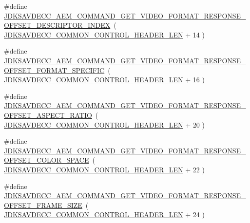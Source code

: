 \begin{DoxyCompactItemize}
\item 
\#define \hyperlink{group__command__get__video__format__response_gad665bc5c28acc6a13b96ad08b5cb703d}{J\+D\+K\+S\+A\+V\+D\+E\+C\+C\+\_\+\+A\+E\+M\+\_\+\+C\+O\+M\+M\+A\+N\+D\+\_\+\+G\+E\+T\+\_\+\+V\+I\+D\+E\+O\+\_\+\+F\+O\+R\+M\+A\+T\+\_\+\+R\+E\+S\+P\+O\+N\+S\+E\+\_\+\+O\+F\+F\+S\+E\+T\+\_\+\+D\+E\+S\+C\+R\+I\+P\+T\+O\+R\+\_\+\+I\+N\+D\+EX}~( \hyperlink{group__jdksavdecc__avtp__common__control__header_gaae84052886fb1bb42f3bc5f85b741dff}{J\+D\+K\+S\+A\+V\+D\+E\+C\+C\+\_\+\+C\+O\+M\+M\+O\+N\+\_\+\+C\+O\+N\+T\+R\+O\+L\+\_\+\+H\+E\+A\+D\+E\+R\+\_\+\+L\+EN} + 14 )
\item 
\#define \hyperlink{group__command__get__video__format__response_ga496580d22b9f558564fd5c42bab2b99d}{J\+D\+K\+S\+A\+V\+D\+E\+C\+C\+\_\+\+A\+E\+M\+\_\+\+C\+O\+M\+M\+A\+N\+D\+\_\+\+G\+E\+T\+\_\+\+V\+I\+D\+E\+O\+\_\+\+F\+O\+R\+M\+A\+T\+\_\+\+R\+E\+S\+P\+O\+N\+S\+E\+\_\+\+O\+F\+F\+S\+E\+T\+\_\+\+F\+O\+R\+M\+A\+T\+\_\+\+S\+P\+E\+C\+I\+F\+IC}~( \hyperlink{group__jdksavdecc__avtp__common__control__header_gaae84052886fb1bb42f3bc5f85b741dff}{J\+D\+K\+S\+A\+V\+D\+E\+C\+C\+\_\+\+C\+O\+M\+M\+O\+N\+\_\+\+C\+O\+N\+T\+R\+O\+L\+\_\+\+H\+E\+A\+D\+E\+R\+\_\+\+L\+EN} + 16 )
\item 
\#define \hyperlink{group__command__get__video__format__response_ga0a5642f617922b5a28527768730f1831}{J\+D\+K\+S\+A\+V\+D\+E\+C\+C\+\_\+\+A\+E\+M\+\_\+\+C\+O\+M\+M\+A\+N\+D\+\_\+\+G\+E\+T\+\_\+\+V\+I\+D\+E\+O\+\_\+\+F\+O\+R\+M\+A\+T\+\_\+\+R\+E\+S\+P\+O\+N\+S\+E\+\_\+\+O\+F\+F\+S\+E\+T\+\_\+\+A\+S\+P\+E\+C\+T\+\_\+\+R\+A\+T\+IO}~( \hyperlink{group__jdksavdecc__avtp__common__control__header_gaae84052886fb1bb42f3bc5f85b741dff}{J\+D\+K\+S\+A\+V\+D\+E\+C\+C\+\_\+\+C\+O\+M\+M\+O\+N\+\_\+\+C\+O\+N\+T\+R\+O\+L\+\_\+\+H\+E\+A\+D\+E\+R\+\_\+\+L\+EN} + 20 )
\item 
\#define \hyperlink{group__command__get__video__format__response_ga3900f7615b8847a54ab70ecdf39f35bb}{J\+D\+K\+S\+A\+V\+D\+E\+C\+C\+\_\+\+A\+E\+M\+\_\+\+C\+O\+M\+M\+A\+N\+D\+\_\+\+G\+E\+T\+\_\+\+V\+I\+D\+E\+O\+\_\+\+F\+O\+R\+M\+A\+T\+\_\+\+R\+E\+S\+P\+O\+N\+S\+E\+\_\+\+O\+F\+F\+S\+E\+T\+\_\+\+C\+O\+L\+O\+R\+\_\+\+S\+P\+A\+CE}~( \hyperlink{group__jdksavdecc__avtp__common__control__header_gaae84052886fb1bb42f3bc5f85b741dff}{J\+D\+K\+S\+A\+V\+D\+E\+C\+C\+\_\+\+C\+O\+M\+M\+O\+N\+\_\+\+C\+O\+N\+T\+R\+O\+L\+\_\+\+H\+E\+A\+D\+E\+R\+\_\+\+L\+EN} + 22 )
\item 
\#define \hyperlink{group__command__get__video__format__response_ga9139fa88fce1d33226f5f2304e59a94b}{J\+D\+K\+S\+A\+V\+D\+E\+C\+C\+\_\+\+A\+E\+M\+\_\+\+C\+O\+M\+M\+A\+N\+D\+\_\+\+G\+E\+T\+\_\+\+V\+I\+D\+E\+O\+\_\+\+F\+O\+R\+M\+A\+T\+\_\+\+R\+E\+S\+P\+O\+N\+S\+E\+\_\+\+O\+F\+F\+S\+E\+T\+\_\+\+F\+R\+A\+M\+E\+\_\+\+S\+I\+ZE}~( \hyperlink{group__jdksavdecc__avtp__common__control__header_gaae84052886fb1bb42f3bc5f85b741dff}{J\+D\+K\+S\+A\+V\+D\+E\+C\+C\+\_\+\+C\+O\+M\+M\+O\+N\+\_\+\+C\+O\+N\+T\+R\+O\+L\+\_\+\+H\+E\+A\+D\+E\+R\+\_\+\+L\+EN} + 24 )

\end{DoxyCompactItemize}
